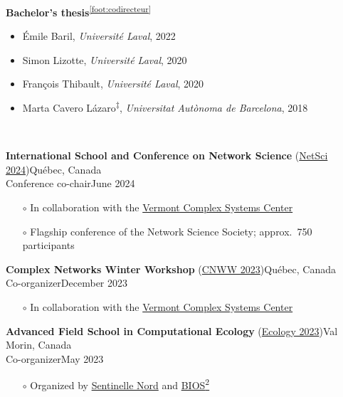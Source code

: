\documentclass[11pt]{article}
\newcommand{\TitreSection}[1]{\colorbox{background}{\makebox[\textwidth-0.5em][c]{\Large\textrm{\textsc{#1}}}}\vspace{0.75\baselineskip}\\}
\begin{document}
%
%
%
\textbf{Bachelor's thesis}\textsuperscript{\ref{foot:codirecteur}}
%
\begin{itemize}
  \item Émile Baril, \textit{Universit\'e Laval}, 2022
  \item Simon Lizotte, \textit{Universit\'e Laval}, 2020
  \item Fran\c{c}ois Thibault, \textit{Universit\'e Laval}, 2020
  \item Marta Cavero L\'azaro\textsuperscript{$\ddagger$}, \textit{Universitat Aut\`onoma de Barcelona}, 2018
\end{itemize} \vspace{0.75\baselineskip}
%
%
%
%
%
\TitreSection{Organizing Activities}
%
\parbox{\textwidth}{%
\textbf{International School and Conference on Network Science} (\href{https://netscisociety.net/events/netsci}{NetSci 2024})\hfill Qu\'ebec, Canada\\
Conference co-chair\hfill June 2024
\begin{itemize}[leftmargin=1.5em]\small
  \item[$\circ$] In collaboration with the \href{https://vermontcomplexsystems.org/}{Vermont Complex Systems Center}
  \item[$\circ$] Flagship conference of the Network Science Society; approx.~750 participants
\end{itemize}}
%
\parbox{\textwidth}{%
\textbf{Complex Networks Winter Workshop} (\href{https://vermontcomplexsystems.org/events/cnww/}{CNWW 2023})\hfill Qu\'ebec, Canada\\
Co-organizer\hfill December 2023
\begin{itemize}[leftmargin=1.5em]\small
  \item[$\circ$] In collaboration with the \href{https://vermontcomplexsystems.org/}{Vermont Complex Systems Center}
\end{itemize}}
%
\parbox{\textwidth}{%
\textbf{Advanced Field School in Computational Ecology} (\href{https://sentinellenord.ulaval.ca/en/ecology2023}{Ecology 2023})\hfill Val Morin, Canada\\
Co-organizer\hfill May 2023
\begin{itemize}[leftmargin=1.5em]\small
  \item[$\circ$] Organized by \href{http://sentinellenord.ulaval.ca/}{Sentinelle Nord} and \href{https://bios2.usherbrooke.ca/}{BIOS\textsuperscript{2}}
\end{itemize}}
\end{document}

